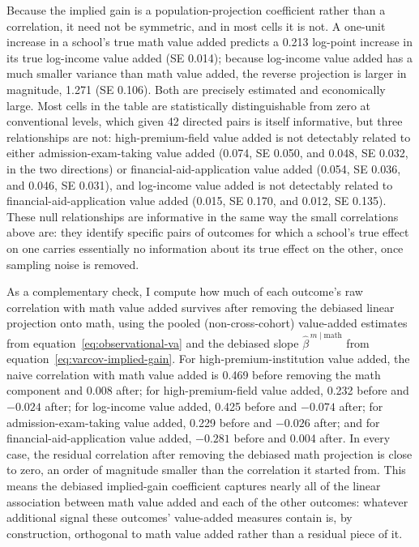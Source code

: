 \documentclass[a4paper, article, english, oneside, unknownkeysallowed, 12pt]{memoir}
\begin{document}
Because the implied gain is a population-projection coefficient rather than a correlation, it need not be symmetric, and in most cells it is not.
A one-unit increase in a school's true math value added predicts a 0.213 log-point increase in its true log-income value added (SE 0.014); because log-income value added has a much smaller variance than math value added, the reverse projection is larger in magnitude, 1.271 (SE 0.106).
Both are precisely estimated and economically large.
Most cells in the table are statistically distinguishable from zero at conventional levels, which given 42 directed pairs is itself informative, but three relationships are not: high-premium-field value added is not detectably related to either admission-exam-taking value added (0.074, SE 0.050, and 0.048, SE 0.032, in the two directions) or financial-aid-application value added (0.054, SE 0.036, and 0.046, SE 0.031), and log-income value added is not detectably related to financial-aid-application value added (0.015, SE 0.170, and 0.012, SE 0.135).
These null relationships are informative in the same way the small correlations above are: they identify specific pairs of outcomes for which a school's true effect on one carries essentially no information about its true effect on the other, once sampling noise is removed.

As a complementary check, I compute how much of each outcome's raw correlation with math value added survives after removing the debiased linear projection onto math, using the pooled (non-cross-cohort) value-added estimates from equation~\eqref{eq:observational-va} and the debiased slope $\widehat\beta^{\,m\mid \text{math}}$ from equation~\eqref{eq:varcov-implied-gain}.
For high-premium-institution value added, the naive correlation with math value added is 0.469 before removing the math component and 0.008 after; for high-premium-field value added, 0.232 before and $-0.024$ after; for log-income value added, 0.425 before and $-0.074$ after; for admission-exam-taking value added, 0.229 before and $-0.026$ after; and for financial-aid-application value added, $-0.281$ before and 0.004 after.
In every case, the residual correlation after removing the debiased math projection is close to zero, an order of magnitude smaller than the correlation it started from.
This means the debiased implied-gain coefficient captures nearly all of the linear association between math value added and each of the other outcomes: whatever additional signal these outcomes' value-added measures contain is, by construction, orthogonal to math value added rather than a residual piece of it.
\end{document}
